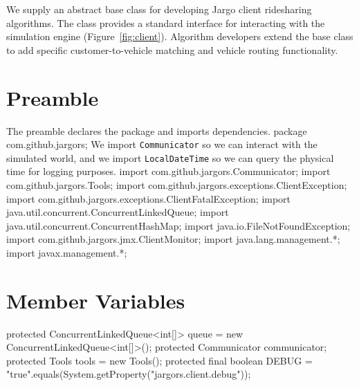 We supply an abstract base class for developing Jargo client ridesharing
algorithms. The class provides a standard interface for interacting with the
simulation engine (Figure~\ref{fig:client}). Algorithm developers extend the
base class to add specific customer-to-vehicle matching and vehicle routing
functionality.

\section{Preamble}
The preamble declares the package and imports dependencies.
\nwenddocs{}\endmoddef{}
package com.github.jargors;
\nwendcode{}\nwdocspar
We import {\tt{}Communicator} so we can interact with the simulated world,
and we import {\tt{}LocalDateTime} so we can query the physical time for
logging purposes.
\nwenddocs{}\plusendmoddef
import com.github.jargors.Communicator;
import com.github.jargors.Tools;
import com.github.jargors.exceptions.ClientException;
import com.github.jargors.exceptions.ClientFatalException;
import java.util.concurrent.ConcurrentLinkedQueue;
import java.util.concurrent.ConcurrentHashMap;
import java.io.FileNotFoundException;
\nwendcode{}\nwdocspar
\nwenddocs{}\plusendmoddef
import com.github.jargors.jmx.ClientMonitor;
import java.lang.management.*;
import javax.management.*;
\nwendcode{}\nwdocspar

\section{Member Variables}
\nwenddocs{}\endmoddef{}
protected ConcurrentLinkedQueue<int[]> queue = new ConcurrentLinkedQueue<int[]>();
protected Communicator communicator;
protected Tools tools = new Tools();
protected final boolean DEBUG =
    "true".equals(System.getProperty("jargors.client.debug"));
\nwendcode{}\nwdocspar
